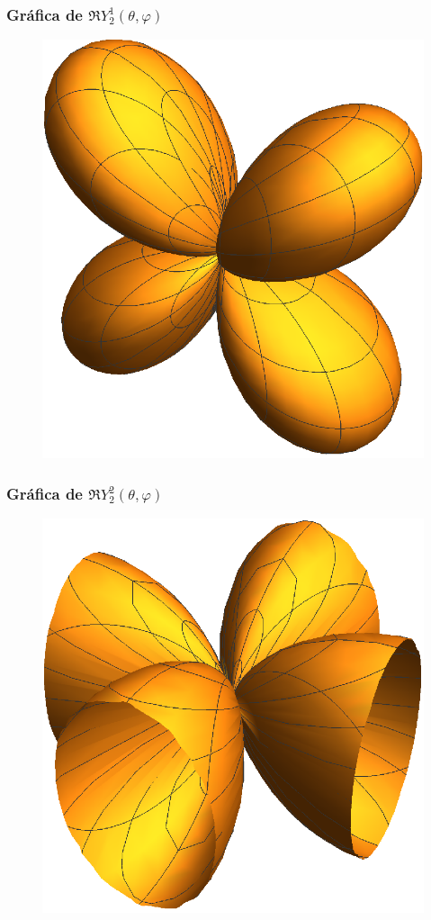 \documentclass[12pt]{beamer}
\begin{document}
\begin{frame}
\frametitle{Gráfica de $\Re{Y_{2}^{1} (\theta, \varphi)}$}
\begin{figure}
    \centering
    \includegraphics[scale=0.7]{Imagenes/AE_Re_21.eps}
\end{figure}
\end{frame}
\begin{frame}
\frametitle{Gráfica de $\Re{Y_{2}^{2} (\theta, \varphi)}$}
\begin{figure}
    \centering
    \includegraphics[scale=0.75]{Imagenes/AE_Re_22.eps}
\end{figure}
\end{frame}
\end{document}
